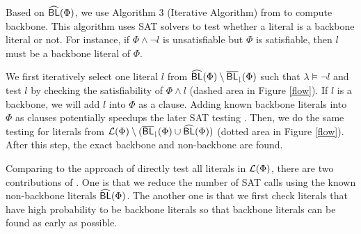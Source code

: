 \medskip
{}
Based on ${\sf \widehat{BL}}(\Phi)$, we use Algorithm 3 (Iterative Algorithm) from \cite{JLM15} to compute backbone.
This algorithm uses SAT solvers to test whether a literal is a backbone literal or not.
For instance, if $\Phi\wedge \neg l$ is unsatisfiable but $\Phi$ is satisfiable, then $l$ must be a backbone literal of $\Phi$.

We first iteratively select one literal $l$ from ${\sf \widehat{BL}}(\Phi)\setminus {\sf \overline{BL}_\downharpoonright}(\Phi)$ such that $\lambda \models \neg l$ and test $l$ by checking the satisfiability of $\Phi\wedge l$ (dashed area in Figure \ref{flow}).
If $l$ is a backbone, we will add $l$ into $\Phi$ as a clause. Adding known backbone literals into $\Phi$ as clauses potentially speedups the later SAT testing \cite{JLM15,MPA2015}.
Then, we do the same testing for literals from $\Lit(\Phi)\setminus (\NBLap(\Phi)\cup\BLap(\Phi))$ (dotted area in Figure \ref{flow}).
After this step, the exact backbone and non-backbone are found.


Comparing to the approach of directly test all literals in $\Lit(\Phi)$, there are two contributions of \tool.
One is that we reduce the number of SAT calls using the known non-backbone literals ${\sf \widehat{BL}}(\Phi)$.
The another one is that we first check literals that have high probability to be backbone literals so that backbone literals can be found as early as possible.




